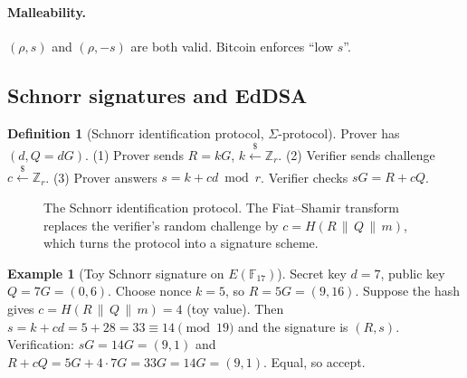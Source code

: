 \documentclass[11pt,a4paper,oneside]{book}
\theoremstyle{plain}
\theoremstyle{definition}
\newtheorem{definition}[theorem]{Definition}
\newtheorem{example}[theorem]{Example}
\theoremstyle{remark}
\newcommand{\Z}{\mathbb{Z}}
\newcommand{\F}{\mathbb{F}}
\newcommand{\sample}{\xleftarrow{\$}}
\begin{document}
\paragraph{Malleability.} $(\rho,s)$ and $(\rho,-s)$ are both valid. Bitcoin enforces ``low $s$''.

\subsection{Schnorr signatures and EdDSA}

\begin{definition}[Schnorr identification protocol, $\Sigma$-protocol]
Prover has $(d,Q=dG)$. (1) Prover sends $R=kG$, $k\sample\Z_r$. (2) Verifier sends challenge $c\sample\Z_r$. (3) Prover answers $s=k+cd\bmod r$. Verifier checks $sG=R+cQ$.
\end{definition}

\begin{figure}[ht]
\centering
{}
\caption{The Schnorr identification protocol. The Fiat--Shamir transform replaces the verifier's random challenge by $c=H(R\,\|\,Q\,\|\,m)$, which turns the protocol into a signature scheme.}
\end{figure}

\begin{example}[Toy Schnorr signature on $E(\F_{17})$]
Secret key $d=7$, public key $Q=7G=(0,6)$. Choose nonce $k=5$, so $R=5G=(9,16)$. Suppose the hash gives $c=H(R\,\|\,Q\,\|\,m)=4$ (toy value). Then $s=k+cd=5+28=33\equiv14\pmod{19}$ and the signature is $(R,s)$. Verification: $sG=14G=(9,1)$ and $R+cQ=5G+4\cdot7G=33G=14G=(9,1)$. Equal, so accept.
\end{example}
\end{document}
